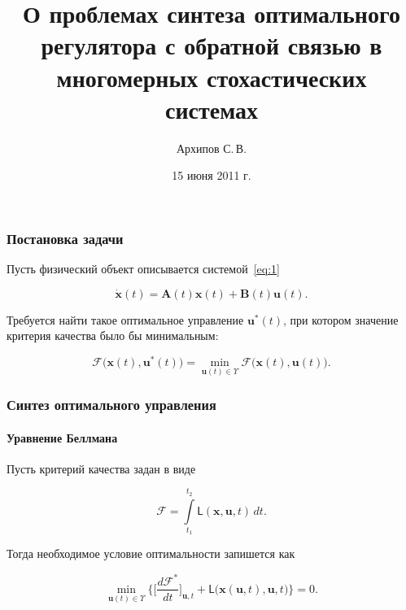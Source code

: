 \documentclass[ignorenonframetext,hyperref={pdftex,unicode},compress]{beamer}
\title{О проблемах синтеза оптимального регулятора с обратной связью в многомерных стохастических системах}
\author{Архипов С.\,В.}
\institute{Научный руководитель: Пакшин П.\,В.}
\date{15 июня 2011 г.}
\begin{document}
\begin{frame}
    \titlepage
\end{frame}



\begin{frame}
	\frametitle{Постановка задачи}

    Пусть физический объект описывается системой~\ref{eq:1}

	\begin{equation}\label{eq:1}
	    \dot{\mathbf{x}}(t) = \mathbf{A}(t)\mathbf{x}(t) + \mathbf{B}(t)\mathbf{u}(t) \text{.}
	\end{equation}

	Требуется найти такое оптимальное управление $\mathbf{u}^*(t)$, при котором значение критерия качества было бы минимальным:
	
	\begin{equation}\label{eq:2}
	    \mathcal{F} \bigl(  \mathbf{x}(t), \mathbf{u}^*(t)  \bigr) = \min_{\mathbf{u}(t) \in \Upsilon} \mathcal{F} \bigl(  \mathbf{x}(t), \mathbf{u}(t)  \bigr)  \text{.}
	\end{equation}
\end{frame}



\begin{frame}
	\frametitle{Синтез оптимального управления}
	\framesubtitle{Уравнение Беллмана}

    Пусть критерий качества задан в виде
    
    \begin{equation}\label{eq:3}
    	\mathcal{F} = \int\limits_{t_1}^{t_2} \mathsf{L}(\mathbf{x}, \mathbf{u}, t)\,dt \text{.}
    \end{equation}
    
    Тогда необходимое условие оптимальности запишется как
    
    \begin{equation}\label{eq:4}
    	\underset{\mathbf{u}(t) \in \Upsilon}{\min} \biggl\{ \biggl[ \frac{d \mathcal{F}^*}{d t} \biggr]_{\mathbf{u}, t} + \mathsf{L}\bigl(  \mathbf{x}(\mathbf{u}, t), \mathbf{u}, t  \bigr) \biggr\} = 0 \text{.}
    \end{equation}
\end{frame}
\end{document}

